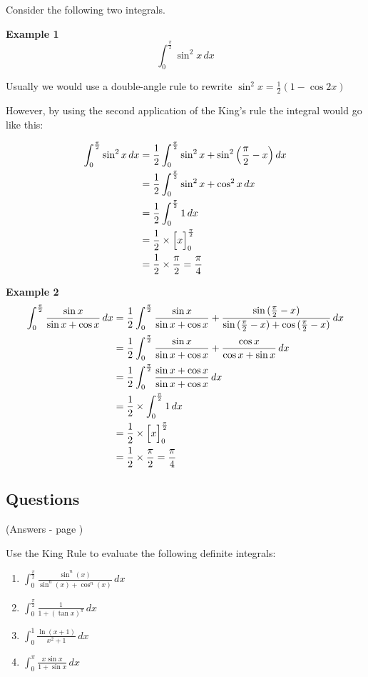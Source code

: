 \documentclass[../main.tex]{subfiles}
\begin{document}
Consider the following two integrals.

\textbf{Example 1}
\[\int_0^{\frac{\pi}{2}} \sin^2{x}\,dx\]

Usually we would use a double-angle rule to rewrite $\sin^2{x}=\frac{1}{2}(1-\cos{2x})$

However, by using the second application of the King's rule the integral would go like this:

\begin{align*}
    \int_0^{\frac{\pi}{2}} \sin^2{x}\,dx &= \frac{1}{2}\int_0^{\frac{\pi}{2}}\sin^2{x}+\sin^2{\Bigl(\frac{\pi}{2}-x\Bigr)}\,dx\\
    &= \frac{1}{2}\int_0^{\frac{\pi}{2}}\sin^2{x}+\cos^2{x}\,dx \\
    &=\frac{1}{2}\int_0^{\frac{\pi}{2}}1\,dx\\
    &=\frac{1}{2}\times \Bigl[x\Bigr]_0^{\frac{\pi}{2}}\\
    &=\frac{1}{2}\times \frac{\pi}{2}=\frac{\pi}{4}
\end{align*}

\textbf{Example 2}
\begin{align*}
    \int_0^{\frac{\pi}{2}} \frac{\sin{x}}{\sin{x}+\cos{x}}\,dx &= \frac{1}{2}\int_0^{\frac{\pi}{2}}\frac{\sin{x}}{\sin{x}+\cos{x}}+\frac{\sin{(\frac{\pi}{2}-x)}}{\sin{(\frac{\pi}{2}-x)}+\cos{(\frac{\pi}{2}-x)}}\,dx\\
    &=\frac{1}{2}\int_0^{\frac{\pi}{2}}\frac{\sin{x}}{\sin{x}+\cos{x}}+\frac{\cos{x}}{\cos{x}+\sin{x}}\,dx\\
    &=\frac{1}{2}\int_0^{\frac{\pi}{2}}\frac{\sin{x}+\cos{x}}{\sin{x}+\cos{x}}\,dx\\
    &=\frac{1}{2}\times \int_0^{\frac{\pi}{2}}1\,dx\\
    &=\frac{1}{2}\times \Bigl[x\Bigr]_0^{\frac{\pi}{2}}\\
    &=\frac{1}{2}\times \frac{\pi}{2}=\frac{\pi}{4}
\end{align*}

\pagebreak
\subsection*{Questions} 
\label{Kings rule}
(Answers - page {\pageref{Kings rule answers}})

Use the King Rule to evaluate the following definite integrals:

\begin{enumerate}[itemsep=0.7cm]
    \item 
    $\int_0^{\frac{\pi}{2}}\frac{\sin^n{(x)}}{\sin^n{(x)}+\cos^n{(x)}}\,dx$

    \item 
    $\int_0^{\frac{\pi}{2}}\frac{1}{1+(\tan{x})^{\pi}}\,dx$

    \item 
    $\int_0^1 \frac{\ln{(x+1)}}{x^2+1}\,dx$

    \item 
    $\int_0^{\pi} \frac{x\sin{x}}{1+\sin{x}}\,dx$


\end{enumerate}


\pagebreak
\end{document}

